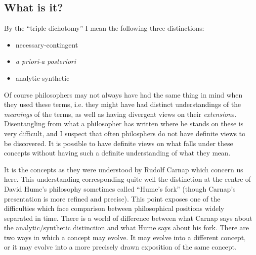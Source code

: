 \documentclass[10pt,titlepage]{article}
\begin{document}
\subsection{What is it?}

By the ``triple dichotomy'' I mean the following three distinctions:

\begin{itemize}
\item necessary-contingent
\item \emph{a priori}-\emph{a posteriori}
\item analytic-synthetic
\end{itemize}

Of course philosophers may not always have had the same thing in mind when they used these terms,
i.e. they might have had distinct understandings of the \emph{meanings} of the terms, as well as having divergent views on their \emph{extension}s.
Disentangling from what a philosopher has written where he stands on these is very difficult, and I suspect that often philosphers do not have definite views to be discovered.
It is possible to have definite views on what falls under these concepts without having such a definite understanding of what they mean.

It is the concepts as they were understood by Rudolf Carnap which concern us here.
This understanding corresponding quite well the distinction at the centre of David Hume's philosophy sometimes called ``Hume's fork'' (though Carnap's presentation is more refined and precise).
This point exposes one of the difficulties which face comparison between philosophical positions widely separated in time.
There is a world of difference between what Carnap says about the analytic/synthetic distinction and what Hume says about his fork.
There are two ways in which a concept may evolve.
It may evolve into a different concept, or it may evolve into a more precisely drawn exposition of the same concept.
\end{document}
